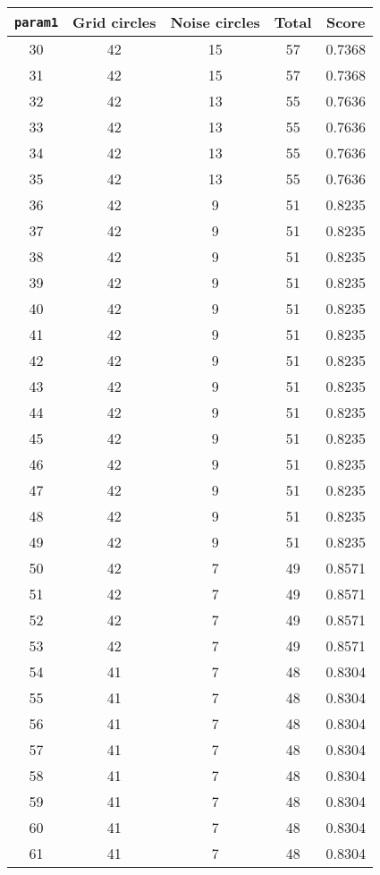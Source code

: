 \documentclass[letterpaper, 12pt]{article}
\begin{document}
\begin{longtable}{|c|c|c|c|c|}
\hline
\textbf{\texttt{param1}} & \textbf{Grid circles} & \textbf{Noise circles} & \textbf{Total} & \textbf{Score} \\
\hline
30 & 42 & 15 & 57 & 0.7368 \\
\hline
31 & 42 & 15 & 57 & 0.7368 \\
\hline
32 & 42 & 13 & 55 & 0.7636 \\
\hline
33 & 42 & 13 & 55 & 0.7636 \\
\hline
34 & 42 & 13 & 55 & 0.7636 \\
\hline
35 & 42 & 13 & 55 & 0.7636 \\
\hline
36 & 42 & 9 & 51 & 0.8235 \\
\hline
37 & 42 & 9 & 51 & 0.8235 \\
\hline
38 & 42 & 9 & 51 & 0.8235 \\
\hline
39 & 42 & 9 & 51 & 0.8235 \\
\hline
40 & 42 & 9 & 51 & 0.8235 \\
\hline
41 & 42 & 9 & 51 & 0.8235 \\
\hline
42 & 42 & 9 & 51 & 0.8235 \\
\hline
43 & 42 & 9 & 51 & 0.8235 \\
\hline
44 & 42 & 9 & 51 & 0.8235 \\
\hline
45 & 42 & 9 & 51 & 0.8235 \\
\hline
46 & 42 & 9 & 51 & 0.8235 \\
\hline
47 & 42 & 9 & 51 & 0.8235 \\
\hline
48 & 42 & 9 & 51 & 0.8235 \\
\hline
49 & 42 & 9 & 51 & 0.8235 \\
\hline
50 & 42 & 7 & 49 & 0.8571 \\
\hline
51 & 42 & 7 & 49 & 0.8571 \\
\hline
52 & 42 & 7 & 49 & 0.8571 \\
\hline
53 & 42 & 7 & 49 & 0.8571 \\
\hline
54 & 41 & 7 & 48 & 0.8304 \\
\hline
55 & 41 & 7 & 48 & 0.8304 \\
\hline
56 & 41 & 7 & 48 & 0.8304 \\
\hline
57 & 41 & 7 & 48 & 0.8304 \\
\hline
58 & 41 & 7 & 48 & 0.8304 \\
\hline
59 & 41 & 7 & 48 & 0.8304 \\
\hline
60 & 41 & 7 & 48 & 0.8304 \\
\hline
61 & 41 & 7 & 48 & 0.8304 \\

\end{longtable}
\end{document}
